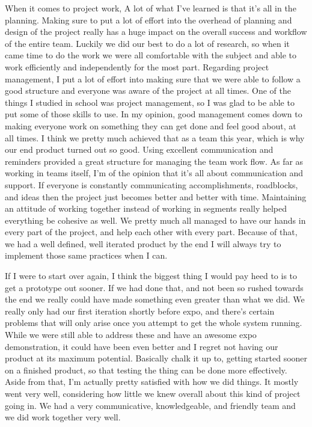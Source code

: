 \documentclass[onecolumn, draftclsnofoot,10pt, compsoc]{IEEEtran}
\begin{document}
When it comes to project work, A lot of what I've learned is that it's all in the planning.
Making sure to put a lot of effort into the overhead of planning and design of the project really has a huge impact on the overall success and workflow of the entire team.
Luckily we did our best to do a lot of research, so when it came time to do the work we were all comfortable with the subject and able to work efficiently and independently for the most part.
Regarding project management, I put a lot of effort into making sure that we were able to follow a good structure and everyone was aware of the project at all times.
One of the things I studied in school was project management, so I was glad to be able to put some of those skills to use.
In my opinion, good management comes down to making everyone work on something they can get done and feel good about, at all times.
I think we pretty much achieved that as a team this year, which is why our end product turned out so good.
Using excellent communication and reminders provided a great structure for managing the team work flow.
As far as working in teams itself, I'm of the opinion that it's all about communication and support.
If everyone is constantly communicating accomplishments, roadblocks, and ideas then the project just becomes better and better with time.
Maintaining an attitude of working together instead of working in segments really helped everything be cohesive as well.
We pretty much all managed to have our hands in every part of the project, and help each other with every part.
Because of that, we had a well defined, well iterated product by the end I will always try to implement those same practices when I can.

If I were to start over again, I think the biggest thing I would pay heed to is to get a prototype out sooner.
If we had done that, and not been so rushed towards the end we really could have made something even greater than what we did.
We really only had our first iteration shortly before expo, and there's certain problems that will only arise once you attempt to get the whole system running.
While we were still able to address these and have an awesome expo demonstration, it could have been even better and I regret not having our product at its maximum potential.
Basically chalk it up to, getting started sooner on a finished product, so that testing the thing can be done more effectively.
Aside from that, I'm actually pretty satisfied with how we did things.
It mostly went very well, considering how little we knew overall about this kind of project going in.
We had a very communicative, knowledgeable, and friendly team and we did work together very well.
\end{document}
